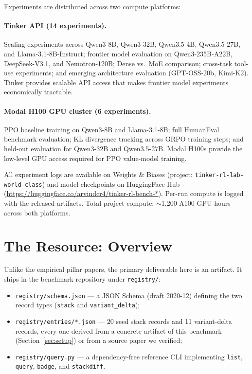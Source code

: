 \documentclass{article}
\providecommand{\secref}[1]{Section~\ref{#1}}
\begin{document}
Experiments are distributed across two compute platforms:

\paragraph{Tinker API (14 experiments).}
Scaling experiments across Qwen3-8B, Qwen3-32B, Qwen3.5-4B, Qwen3.5-27B,
and Llama-3.1-8B-Instruct; frontier model evaluation on Qwen3-235B-A22B,
DeepSeek-V3.1, and Nemotron-120B; Dense vs.~MoE comparison; cross-task
tool-use experiments; and emerging architecture evaluation (GPT-OSS-20b,
Kimi-K2). Tinker provides scalable API access that makes frontier model
experiments economically tractable.

\paragraph{Modal H100 GPU cluster (6 experiments).}
PPO baseline training on Qwen3-8B and Llama-3.1-8B; full HumanEval
benchmark evaluation; KL divergence tracking across GRPO training steps;
and held-out evaluation for Qwen3-32B and Qwen3.5-27B. Modal H100s
provide the low-level GPU access required for PPO value-model training.

All experiment logs are available on Weights \& Biases (project:
\texttt{tinker-rl-lab-world-class}) and model checkpoints on HuggingFace
Hub (\url{https://huggingface.co/arvindcr4/tinker-rl-bench-*}).
Per-run compute is logged with the released artifacts. Total project compute:
$\sim$1,200 A100 GPU-hours across both platforms.

 \section{The Resource: Overview}
\label{sec:p6-overview}
Unlike the empirical pillar papers, the primary deliverable here is an
artifact. It ships in the benchmark repository under \texttt{registry/}:

\begin{itemize}[leftmargin=1.5em, itemsep=0.15em]
  \item \texttt{registry/schema.json} --- a JSON Schema (draft 2020-12)
        defining the two record types (\texttt{stack} and
        \texttt{variant_delta});
  \item \texttt{registry/entries/*.json} --- 20 seed stack records and 11
        variant-delta records, every one derived from a concrete artifact of
        this benchmark (\secref{sec:setup}) or from a source paper we verified;
  \item \texttt{registry/query.py} --- a dependency-free reference CLI
        implementing \texttt{list}, \texttt{query}, \texttt{badge}, and
        \texttt{stackdiff}.
\end{itemize}
\end{document}
